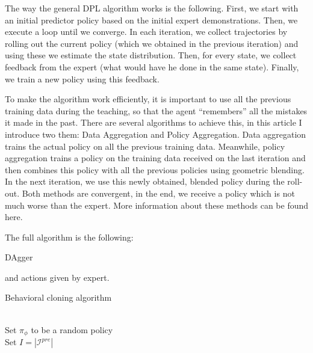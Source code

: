 \documentclass{article}
\begin{document}
The way the general DPL algorithm works is the following. First, we start with an initial predictor policy based on the initial expert demonstrations. Then, we execute a loop until we converge. In each iteration, we collect trajectories by rolling out the current policy (which we obtained in the previous iteration) and using these we estimate the state distribution. Then, for every state, we collect feedback from the expert (what would have he done in the same state). Finally, we train a new policy using this feedback.

To make the algorithm work efficiently, it is important to use all the previous training data during the teaching, so that the agent “remembers” all the mistakes it made in the past. There are several algorithms to achieve this, in this article I introduce two them: Data Aggregation and Policy Aggregation. Data aggregation trains the actual policy on all the previous training data. Meanwhile, policy aggregation trains a policy on the training data received on the last iteration and then combines this policy with all the previous policies using geometric blending. In the next iteration, we use this newly obtained, blended policy during the roll-out. Both methods are convergent, in the end, we receive a policy which is not much worse than the expert. More information about these methods can be found here.

The full algorithm is the following:



\begin{algorithm}
	\onehalfspacing
	\caption{DAgger} 
	\begin{algorithmic}[1]
		and actions given by expert.
		\\
		\EndFor 
	\end{algorithmic} 
\end{algorithm}

\begin{algorithm}
	\caption{Behavioral cloning algorithm}\label{algo:BC}
	\begin{algorithmic}[1]
		\\
		Set {$\pi_\phi$ to be a random policy}\\
		Set {$I = |\mathcal{I}^{pre}| $}
			
		\end{algorithmic}
	\end{algorithm}
	
\end{document}
